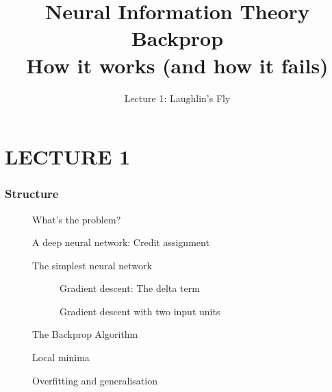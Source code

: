 \documentclass{beamer}
\title[{\em PSY6308}: Information Theory] 
{Neural Information Theory}
\subtitle{Lecture 1: Laughlin's Fly} %
\date{}
\begin{document}


\section{LECTURE 1} %

\title{%
Backprop\\How it works (and how it fails)}
\subtitle{} %
\setcounter{framenumber}{0}
\begin{frame}
  \maketitle %
\end{frame}

\begin{frame}
  \frametitle{Structure}
 \begin{description}
\item[ ] What's the problem?
\item[] A deep neural network: Credit assignment
\item[] The simplest neural network
 \begin{description}
 	\item[] Gradient descent: The delta term
	\item[] Gradient descent with two input units
\end{description}
\item[] The Backprop Algorithm 
\item[] Local minima
\item[] Overfitting and generalisation
\end{description}
\end{frame}
\end{document}
